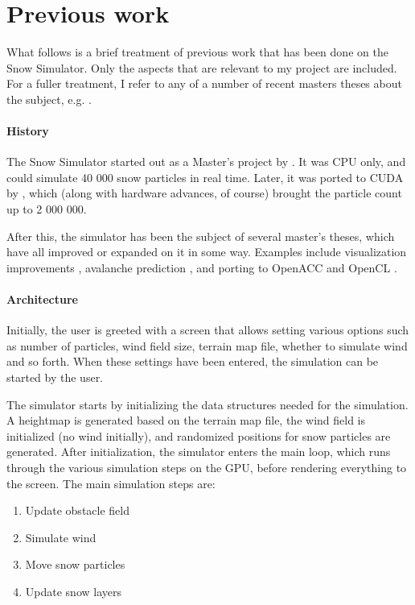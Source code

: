 \chapter{Previous work}
What follows is a brief treatment of previous work that has been done on the Snow Simulator. Only the aspects that are relevant to my project are included. For a fuller treatment, I refer to any of a number of recent masters theses about the subject, e.g. \citet{boge2014avalanche}.
\subsubsection*{History}
The Snow Simulator started out as a Master's project by \citet{saltvik2006parallel}. It was CPU only, and could simulate 40 000 snow particles in real time. Later, it was ported to CUDA by \citet{eidissen2009utilizing}, which (along with hardware advances, of course) brought the particle count up to 2 000 000.

After this, the simulator has been the subject of several master's theses, which have all improved or expanded on it in some way. Examples include visualization improvements \citep{nordahl2013enhancing}, avalanche prediction \citep{boge2014avalanche}, and porting to OpenACC \citep{mikalsen2013openacc} and OpenCL \citep{vestre2012enhancing}.
\subsubsection*{Architecture}
Initially, the user is greeted with a screen that allows setting various options such as number of particles, wind field size, terrain map file, whether to simulate wind and so forth. When these settings have been entered, the simulation can be started by the user.

The simulator starts by initializing the data structures needed for the simulation. A heightmap is generated based on the terrain map file, the wind field is initialized (no wind initially), and randomized positions for snow particles are generated. After initialization, the simulator enters the main loop, which runs through the various simulation steps on the GPU, before rendering everything to the screen. The main simulation steps are:
\begin{enumerate}
\item Update obstacle field
\item Simulate wind
\item Move snow particles
\item Update snow layers
\end{enumerate}

